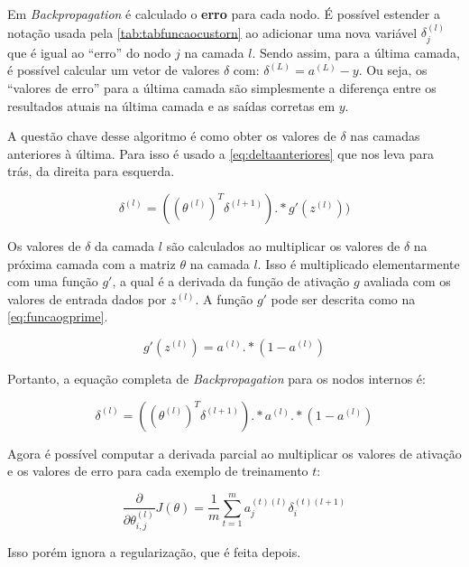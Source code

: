 Em \textit{Backpropagation} é calculado o \textbf{erro} para cada nodo. É possível estender a notação usada pela \autoref{tab:tabfuncaocustorn} ao adicionar uma nova variável $\delta_j^{(l)}$ que é igual ao ``erro'' do nodo $j$ na camada $l$. Sendo assim, para a última camada, é possível calcular um vetor de valores $\delta$ com: $\delta^{(L)} = a^{(L)} - y$. Ou seja, os ``valores de erro'' para a última camada são simplesmente a diferença entre os resultados atuais na última camada e as saídas corretas em $y$.

A questão chave desse algoritmo é como obter os valores de $\delta$ nas camadas anteriores à última. Para isso é usado a \autoref{eq:deltaanteriores} que nos leva para trás, da direita para esquerda.

\begin{equation}\label{eq:deltaanteriores}
\delta^{(l)} = ((\theta^{(l)})^T \delta^{(l+1)}) .* g'(z^{(l)}))
\end{equation}

Os valores de $\delta$ da camada $l$ são calculados ao multiplicar os valores de $\delta$ na próxima camada com a matriz $\theta$ na camada $l$. Isso é multiplicado elementarmente com uma função $g'$, a qual é a derivada da função de ativação $g$ avaliada com os valores de entrada dados por $z^{(l)}$. A função $g'$ pode ser descrita como na \autoref{eq:funcaogprime}.

\begin{equation}\label{eq:funcaogprime}
g'(z^{(l)}) = a^{(l)} .* (1 - a^{(l)}) 
\end{equation}

Portanto, a equação completa de \textit{Backpropagation} para os nodos internos é:

\begin{equation}
\delta^{(l)} = ((\theta^{(l)})^T \delta^{(l+1)}) .* a^{(l)} .* (1 - a^{(l)}) \nonumber
\end{equation}

Agora é possível computar a derivada parcial ao multiplicar os valores de ativação e os valores de erro para cada exemplo de treinamento $t$:

\begin{equation}
\frac{\partial}{\partial\theta_{i,j}^{(l)}} J(\theta) = \frac{1}{m} \sum\limits_{t=1}^{m} a_j^{(t)(l)} \delta_i^{(t)(l+1)} \nonumber
\end{equation}

Isso porém ignora a regularização, que é feita depois.

